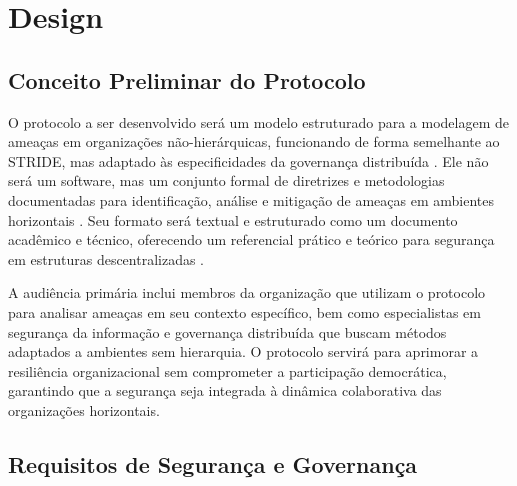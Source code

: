 
%

\chapter{Design}
\label{cha:design}

\glsresetall
 
\section{Conceito Preliminar do Protocolo}
\label{sec:preliminary_protocol_concept}

O protocolo a ser desenvolvido será um modelo estruturado para a modelagem de
ameaças em organizações não-hierárquicas, funcionando de forma semelhante ao
STRIDE, mas adaptado às especificidades da governança distribuída
\cite{ThreatModelingdesigningForSecurity}.
Ele não será um software, mas um conjunto formal de diretrizes e metodologias documentadas
para identificação, análise e mitigação de ameaças em ambientes horizontais \cite{Colbac}.
Seu formato será textual e estruturado como um documento acadêmico e técnico,
oferecendo um referencial prático e teórico para segurança em estruturas
descentralizadas .

A audiência primária inclui membros da organização que utilizam o protocolo para
analisar ameaças em seu contexto específico, bem como especialistas em segurança
da informação e governança distribuída que buscam métodos adaptados a ambientes
sem hierarquia. O protocolo servirá para aprimorar a resiliência organizacional
sem comprometer a participação democrática, garantindo que a segurança seja
integrada à dinâmica colaborativa das organizações horizontais.

\section{Requisitos de Segurança e Governança}
\label{sec:security_governance_requirements}

